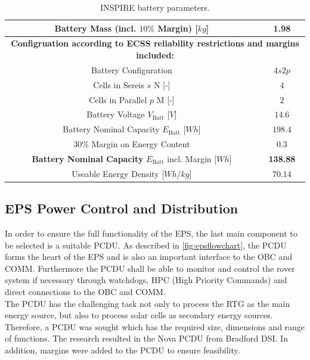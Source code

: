 \begin{table}[htb]
{\begin{tabular}{|c|c|}
\textbf{Battery Mass} (incl. $10\%$ Margin) [$kg$]                                         & \textbf{1.98}                        \\ \hline
\multicolumn{2}{|c|}{\textbf{Configruation according to ECSS reliability restrictions and margins included:}} \\ \hline
Battery Configuration                                                           & $4s2p$                        \\ \hline
Cells in Sereis $s$ N [-]                                                       & $4$                           \\ \hline
Cells in Parallel $p$ M [-]                                                     & $2$                           \\ \hline
Battery Voltage $V_\text{Batt}$ [$V$]                                             & $14.6 $                       \\ \hline
Battery Nominal Capacity $E_\text{Batt}$ [$Wh$]                                   & $198.4$                       \\ \hline
$30\%$ Margin on Energy Content                                                 & $0.3$                         \\ \hline
\textbf{Battery Nominal Capacity} $E_\text{Batt}$ incl. Margin [$Wh$]                      & \textbf{138.88}                      \\ \hline
Useable Energy Density [$Wh/kg$]                                              & $70.14$                       \\ \hline
\end{tabular}%
}
\caption{INSPIRE battery parameters.}
\label{tab:battery}
\end{table}


\subsection{EPS Power Control and Distribution}
In order to ensure the full functionality of the EPS, the last main component to be selected is a suitable PCDU. As described in \autoref{fig:epsflowchart}, the PCDU forms the heart of the EPS and is also an important interface to the OBC and COMM. Furthermore the PCDU shall be able to monitor and control the rover system if necessary through watchdogs, HPC (High Priority Commands) and direct connections to the OBC and COMM.\\
The PCDU has the challenging task not only to process the RTG as the main energy source, but also to process solar cells as secondary energy sources. Therefore, a PCDU was sought which has the required size, dimensions and range of functions. The research resulted in the Nova PCDU from Bradford DSI. In addition, margins were added to the PCDU to ensure feasibility.

